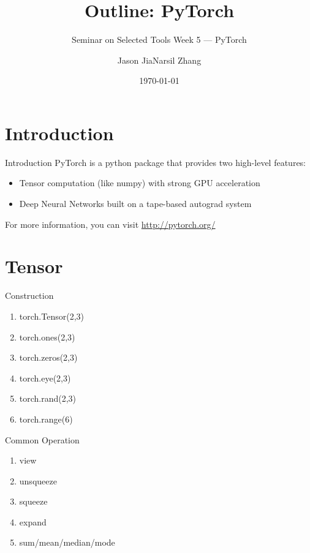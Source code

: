 \documentclass[english, nochinese]{../TeXTemplate/pkuslide}
\title{Outline: PyTorch}
\subtitle{Seminar on Selected Tools Week 5 --- PyTorch}
\author{Jason Jia\qquad Narsil Zhang}
\date{\today}
\begin{document}
\begin{frame}
\titlepage
\end{frame}

\begin{frame}
\tableofcontents[subsectionstyle=show]
\end{frame}

\section{Introduction}

\begin{frame}
\sectionpage
\end{frame}

\begin{frame}{Introduction}
PyTorch is a python package that provides two high-level features:
\begin{itemize}
\item Tensor computation (like numpy) with strong GPU acceleration
\item Deep Neural Networks built on a tape-based autograd system
\end{itemize}
For more information, you can visit \url{http://pytorch.org/}
\end{frame}

\section{Tensor}

\begin{frame}
\sectionpage
\end{frame}

\begin{frame}{Construction}
\begin{enumerate}
    \item torch.Tensor(2,3)
    \item torch.ones(2,3)
    \item torch.zeros(2,3)
    \item torch.eye(2,3)
    \item torch.rand(2,3)
    \item torch.range(6)
\end{enumerate}
\end{frame}

\begin{frame}{Common Operation}
\begin{enumerate}
    \item view
	\item unsqueeze
	\item squeeze
	\item expand
	\item sum/mean/median/mode
\end{enumerate}
\end{frame}
\end{document}
